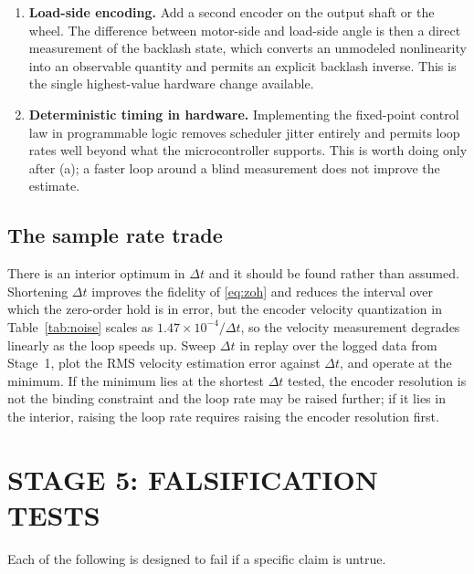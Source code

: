 \begin{enumerate}[label=(\alph*),leftmargin=*]
\item \textbf{Load-side encoding.} Add a second encoder on the output shaft or
the wheel. The difference between motor-side and load-side angle is then a
direct measurement of the backlash state, which converts an unmodeled
nonlinearity into an observable quantity and permits an explicit backlash
inverse. This is the single highest-value hardware change available.
\item \textbf{Deterministic timing in hardware.} Implementing the fixed-point
control law in programmable logic removes scheduler jitter entirely and permits
loop rates well beyond what the microcontroller supports. This is worth doing
only after (a); a faster loop around a blind measurement does not improve the
estimate.
\end{enumerate}

\subsection{The sample rate trade}

There is an interior optimum in $\Delta t$ and it should be found rather
than assumed. Shortening $\Delta t$ improves the fidelity of \eqref{eq:zoh} and
reduces the interval over which the zero-order hold is in error, but the encoder
velocity quantization in Table~\ref{tab:noise} scales as
$1.47\times10^{-4}/\Delta t$, so the velocity measurement degrades linearly as
the loop speeds up. Sweep $\Delta t$ in replay over the logged data from
Stage~1, plot the RMS velocity estimation error against $\Delta t$, and operate
at the minimum. If the minimum lies at the shortest $\Delta t$ tested, the
encoder resolution is not the binding constraint and the loop rate may be raised
further; if it lies in the interior, raising the loop rate requires raising the
encoder resolution first.

\section{STAGE 5: FALSIFICATION TESTS}

Each of the following is designed to fail if a specific claim is untrue.

